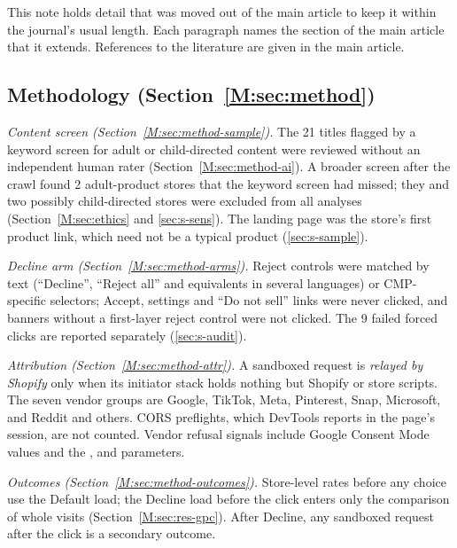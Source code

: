 \documentclass[preprint,11pt,authoryear,a4paper]{elsarticle}
\begin{document}
This note holds detail that was moved out of the main article to keep it within the journal's usual length. Each paragraph names the section of the main article that it extends. References to the literature are given in the main article.

\subsection*{Methodology (Section~\ref*{M:sec:method})}

\emph{Content screen (Section~\ref*{M:sec:method-sample}).} The 21 titles flagged by a keyword screen for adult or child-directed content were reviewed without an independent human rater (Section~\ref*{M:sec:method-ai}). A broader screen after the crawl found 2 adult-product stores that the keyword screen had missed; they and two possibly child-directed stores were excluded from all analyses (Section~\ref*{M:sec:ethics} and \ref{sec:s-sens}). The landing page was the store's first product link, which need not be a typical product (\ref{sec:s-sample}).

\emph{Decline arm (Section~\ref*{M:sec:method-arms}).} Reject controls were matched by text (``Decline'', ``Reject all'' and equivalents in several languages) or CMP-specific selectors; Accept, settings and ``Do not sell'' links were never clicked, and banners without a first-layer reject control were not clicked. The 9 failed forced clicks are reported separately (\ref{sec:s-audit}).

\emph{Attribution (Section~\ref*{M:sec:method-attr}).} A sandboxed request is \emph{relayed by Shopify} only when its initiator stack holds nothing but Shopify or store scripts. The seven vendor groups are Google, TikTok, Meta, Pinterest, Snap, Microsoft, and Reddit and others. CORS preflights, which DevTools reports in the page's session, are not counted. Vendor refusal signals include Google Consent Mode values and the ,  and  parameters.

\emph{Outcomes (Section~\ref*{M:sec:method-outcomes}).} Store-level rates before any choice use the Default load; the Decline load before the click enters only the comparison of whole visits (Section~\ref*{M:sec:res-gpc}). After Decline, any sandboxed request after the click is a secondary outcome.
\end{document}
